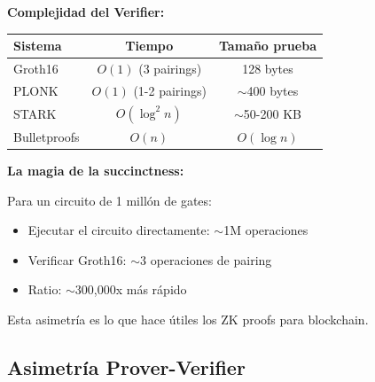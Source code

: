 \documentclass[11pt,a4paper,twoside,openright]{book}
\theoremstyle{definition}
\theoremstyle{plain}
\theoremstyle{remark}
\begin{document}
\begin{mathnote}
\textbf{Complejidad del Verifier:}

\begin{center}
\begin{tabular}{lcc}
\toprule
\textbf{Sistema} & \textbf{Tiempo} & \textbf{Tamaño prueba} \\
\midrule
Groth16 & $O(1)$ (3 pairings) & 128 bytes \\
PLONK & $O(1)$ (1-2 pairings) & $\sim$400 bytes \\
STARK & $O(\log^2 n)$ & $\sim$50-200 KB \\
Bulletproofs & $O(n)$ & $O(\log n)$ \\
\bottomrule
\end{tabular}
\end{center}

\textbf{La magia de la succinctness:}

Para un circuito de 1 millón de gates:
\begin{itemize}
    \item Ejecutar el circuito directamente: $\sim$1M operaciones
    \item Verificar Groth16: $\sim$3 operaciones de pairing
    \item Ratio: $\sim$300,000x más rápido
\end{itemize}

Esta asimetría es lo que hace útiles los ZK proofs para blockchain.
\end{mathnote}

\subsection{Asimetría Prover-Verifier}
\end{document}
